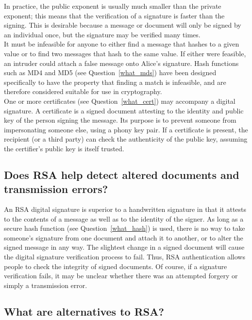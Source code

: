 In practice, the public exponent is usually much smaller than the
private exponent; this means that the verification of a signature is
faster than the signing. This is desirable because a message or
document will only be signed by an individual once, but the signature
may be verified many times.\\

It must be infeasible for anyone to either find a message that hashes to a
given value or to find two messages that hash to the same value.  If either
were feasible, an intruder could attach a false message onto Alice's
signature. Hash functions such as MD4 and MD5 (see Question~\ref{what_mds})
have been designed specifically to have the property that finding a match
is infeasible, and are therefore considered suitable for use in
cryptography.\\

One or more certificates (see Question~\ref{what_cert}) may accompany a
digital signature. A certificate is a signed document attesting to the
identity and public key of the person signing the message. Its purpose is
to prevent someone from impersonating someone else, using a phony key pair.
If a certificate is present, the recipient (or a third party) can check the
authenticity of the public key, assuming the certifier's public key is
itself trusted.

\subsection{Does RSA help detect altered documents and transmission errors?}

An RSA digital signature is superior to a handwritten signature in that it
attests to the contents of a message as well as to the identity of the
signer. As long as a secure hash function (see Question~\ref{what_hash}) is
used, there is no way to take someone's signature from one document and
attach it to another, or to alter the signed message in any way. The
slightest change in a signed document will cause the digital signature
verification process to fail. Thus, RSA authentication allows people to
check the integrity of signed documents. Of course, if a signature
verification fails, it may be unclear whether there was an attempted
forgery or simply a transmission error.\\

\subsection{What are alternatives to RSA?}
\label{what_alt_rsa}

